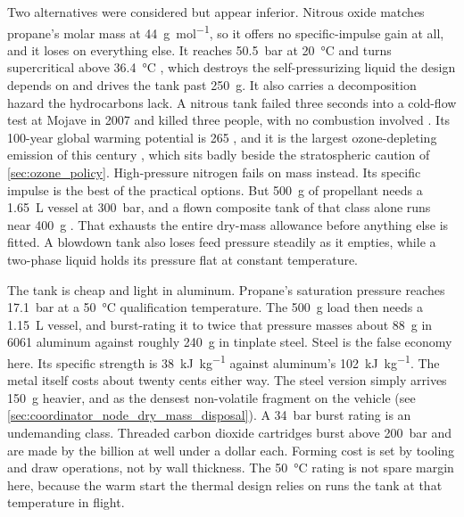 \documentclass{article}
\begin{document}
Two alternatives were considered but appear inferior. Nitrous oxide matches propane's molar mass at \SI{44}{\gram\per\mole}, so it offers no specific-impulse gain at all, and it loses on everything else. It reaches \SI{50.5}{\bar} at \SI{20}{\celsius} and turns supercritical above \SI{36.4}{\celsius} \cite{nist_webbook_n2o}, which destroys the self-pressurizing liquid the design depends on and drives the tank past \SI{250}{\gram}. It also carries a decomposition hazard the hydrocarbons lack. A nitrous tank failed three seconds into a cold-flow test at Mojave in 2007 and killed three people, with no combustion involved \cite{flightglobal_scaled_n2o}. Its 100-year global warming potential is 265 \cite{ghgprotocol_gwp_values}, and it is the largest ozone-depleting emission of this century \cite{ravishankara2009n2o}, which sits badly beside the stratospheric caution of \autoref{sec:ozone_policy}. High-pressure nitrogen fails on mass instead. Its specific impulse is the best of the practical options. But \SI{500}{\gram} of propellant needs a \SI{1.65}{\liter} vessel at \SI{300}{\bar}, and a flown composite tank of that class alone runs near \SI{400}{\gram} \cite{meyer_copv}. That exhausts the entire dry-mass allowance before anything else is fitted. A blowdown tank also loses feed pressure steadily as it empties, while a two-phase liquid holds its pressure flat at constant temperature.

The tank is cheap and light in aluminum. Propane's saturation pressure reaches \SI{17.1}{\bar} at a \SI{50}{\celsius} qualification temperature. The \SI{500}{\gram} load then needs a \SI{1.15}{\liter} vessel, and burst-rating it to twice that pressure masses about \SI{88}{\gram} in 6061 aluminum against roughly \SI{240}{\gram} in tinplate steel. Steel is the false economy here. Its specific strength is \SI{38}{\kilo\joule\per\kilo\gram} against aluminum's \SI{102}{\kilo\joule\per\kilo\gram}. The metal itself costs about twenty cents either way. The steel version simply arrives \SI{150}{\gram} heavier, and as the densest non-volatile fragment on the vehicle (see \autoref{sec:coordinator_node_dry_mass_disposal}). A \SI{34}{\bar} burst rating is an undemanding class. Threaded carbon dioxide cartridges burst above \SI{200}{\bar} and are made by the billion at well under a dollar each. Forming cost is set by tooling and draw operations, not by wall thickness. The \SI{50}{\celsius} rating is not spare margin here, because the warm start the thermal design relies on runs the tank at that temperature in flight.
 
\end{document}
